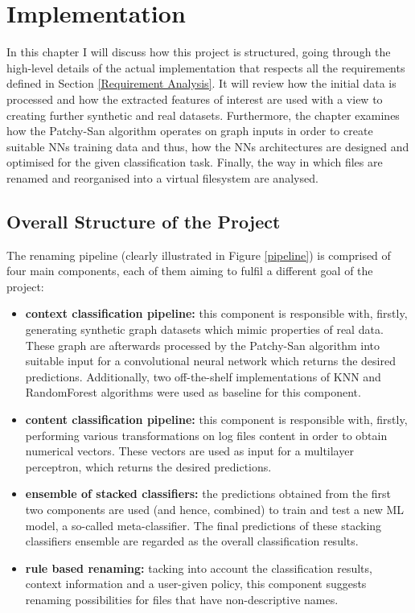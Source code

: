 

\chapter{Implementation}

In this chapter I will discuss how this project is structured, going through the high-level details of the actual implementation that respects all the requirements defined in Section \ref{Requirement Analysis}. It will review how the initial data is processed and how the extracted features of interest are used with a view to creating further synthetic and real datasets. Furthermore, the chapter examines how the Patchy-San algorithm operates on graph inputs in order to create suitable NNs training data and thus, how the NNs architectures are designed and optimised for the given classification task. Finally, the way in which files are renamed and reorganised into a virtual filesystem are analysed. \\



\section{Overall Structure of the Project}

The renaming pipeline (clearly illustrated in Figure \ref{pipeline}) is comprised of four main components, each of them aiming to fulfil a different goal of the project:

\begin{itemize}
    \item \textbf{context classification pipeline:} this component is responsible with, firstly, generating synthetic graph datasets which mimic properties of real data. These graph are afterwards processed by the Patchy-San algorithm into suitable input for a convolutional neural network  which returns the desired predictions. Additionally, two off-the-shelf implementations of KNN and RandomForest algorithms were used as baseline for this component. 

    \item \textbf{content classification pipeline:} this component is responsible with, firstly, performing various transformations on log files content in order to obtain numerical vectors. These vectors are used as input for a multilayer perceptron, which returns the desired predictions.
    
    \item \textbf{ensemble of stacked classifiers:} the predictions obtained from the first two components are used (and hence, combined) to train and test a new ML model, a so-called meta-classifier. The final predictions of these stacking classifiers ensemble are regarded as the overall classification results. 
    
    \item \textbf{rule based renaming:} tacking into account the classification results, context information and a user-given policy, this component suggests renaming possibilities for files that have non-descriptive names. 
    
\end{itemize}

